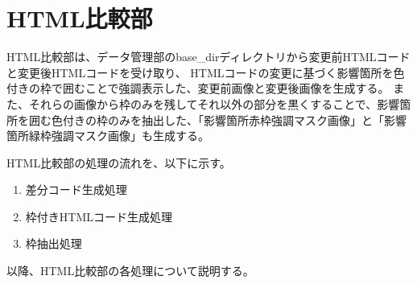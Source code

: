 \section{HTML比較部}\label{sec:Affected_area_extraction}
HTML比較部は、データ管理部のbase\_dirディレクトリから変更前HTMLコードと変更後HTMLコードを受け取り、
HTMLコードの変更に基づく影響箇所を色付きの枠で囲むことで強調表示した、変更前画像と変更後画像を生成する。
また、それらの画像から枠のみを残してそれ以外の部分を黒くすることで、影響箇所を囲む色付きの枠のみを抽出した、「影響箇所赤枠強調マスク画像」と「影響箇所緑枠強調マスク画像」も生成する。
\par
HTML比較部の処理の流れを、以下に示す。
\begin{enumerate}
    \item 差分コード生成処理
    \item 枠付きHTMLコード生成処理
    \item 枠抽出処理
\end{enumerate}
\par
以降、HTML比較部の各処理について説明する。

